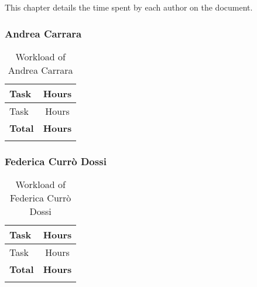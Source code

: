 This chapter details the time spent by each author on the document.

\subsubsection{Andrea Carrara}
\renewcommand{\arraystretch}{1.5}
\begin{longtable}{|p{8.5cm}|c|}
    \hline \rowcolor{polimiblue!40}
    \textbf{Task} & \textbf{Hours} \\ \hline
    Task & Hours \\ \hline
    \hline \rowcolor{polimiblue!40}
    \textbf{Total} & \textbf{Hours} \\ \hline
\caption{Workload of Andrea Carrara}
\end{longtable}

\subsubsection{Federica Currò Dossi}
\renewcommand{\arraystretch}{1.5}
\begin{longtable}{|p{8.5cm}|c|}
    \hline \rowcolor{polimiblue!40}
    \textbf{Task} & \textbf{Hours} \\ \hline
    Task & Hours \\ \hline
    \hline \rowcolor{polimiblue!40}
    \textbf{Total} & \textbf{Hours} \\ \hline
\caption{Workload of Federica Currò Dossi}
\end{longtable}
